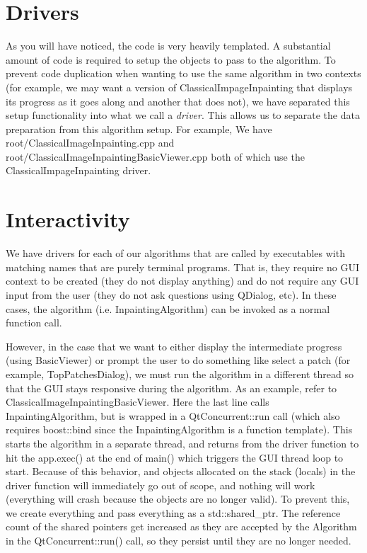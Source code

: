 \documentclass{InsightArticle}
\begin{document}
\section{Drivers}
As you will have noticed, the code is very heavily templated. A substantial amount of code is required to setup the objects to pass to the algorithm. To prevent code duplication when wanting to use the same algorithm in two contexts (for example, we may want a version of ClassicalImpageInpainting that displays its progress as it goes along and another that does not), we have separated this setup functionality into what we call a \emph{driver}. This allows us to separate the data preparation from this algorithm setup. For example, We have root/ClassicalImageInpainting.cpp and root/ClassicalImageInpaintingBasicViewer.cpp both of which use the ClassicalImpageInpainting driver.

\section{Interactivity}
We have drivers for each of our algorithms that are called by executables with matching names that are purely terminal programs. That is, they require no GUI context to be created (they do not display anything) and do not require any GUI input from the user (they do not ask questions using QDialog, etc). In these cases, the algorithm  (i.e. InpaintingAlgorithm) can be invoked as a normal function call.

However, in the case that we want to either display the intermediate progress (using BasicViewer) or prompt the user to do something like select a patch (for example, TopPatchesDialog), we must run the algorithm in a different thread so that the GUI stays responsive during the algorithm. As an example, refer to ClassicalImageInpaintingBasicViewer. Here the last line calls InpaintingAlgorithm, but is wrapped in a QtConcurrent::run call (which also requires boost::bind since the InpaintingAlgorithm is a function template). This starts the algorithm in a separate thread, and returns from the driver function to hit the app.exec() at the end of main() which triggers the GUI thread loop to start. Because of this behavior, and objects allocated on the stack (locals) in the driver function will immediately go out of scope, and nothing will work (everything will crash because the objects are no longer valid). To prevent this, we create everything and pass everything as a std::shared_ptr. The reference count of the shared pointers get increased as they are accepted by the Algorithm in the QtConcurrent::run() call, so they persist until they are no longer needed.
\end{document}
